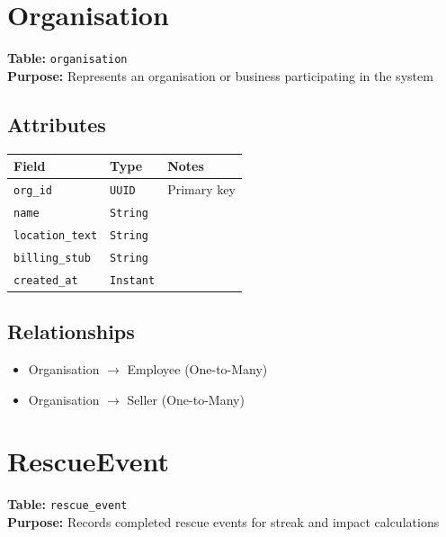 \documentclass[a4paper,11pt]{article}
\begin{document}
\section{Organisation}

\textbf{Table:} \texttt{organisation} \\
\textbf{Purpose:} Represents an organisation or business participating in the system




\subsection*{Attributes}
\begin{longtable}{|p{4cm}|p{3cm}|p{6cm}|}
\hline
\textbf{Field} & \textbf{Type} & \textbf{Notes} \\
\hline
\texttt{org\_id} & \texttt{UUID} & Primary key \\
\texttt{name} & \texttt{String} &  \\
\texttt{location\_text} & \texttt{String} &  \\
\texttt{billing\_stub} & \texttt{String} &  \\
\texttt{created\_at} & \texttt{Instant} &  \\
\hline



\end{longtable}

\subsection*{Relationships}
\begin{itemize}
  \item Organisation $\rightarrow$ Employee (One-to-Many)
  \item Organisation $\rightarrow$ Seller (One-to-Many)

\end{itemize}


\section{RescueEvent}

\textbf{Table:} \texttt{rescue\_event} \\
\textbf{Purpose:} Records completed rescue events for streak and impact calculations
\end{document}
